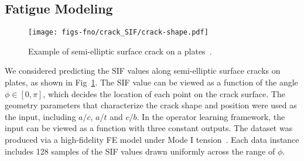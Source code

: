 \subsection{Fatigue Modeling} 
\begin{figure}
    \centering
    \setlength\tabcolsep{0pt}
\texttt{[image: figs-fno/crack\_SIF/crack-shape.pdf]}
    \caption{\small Example of semi-elliptic surface  crack on a plates~\citep{merrell2024stress}. }
    \label{fig:SIF_shape}
\end{figure}
We considered predicting the SIF values along semi-elliptic surface cracks on plates, as shown in Fig~\ref{fig:SIF_shape}. The SIF value can be viewed as a function of the angle $\phi \in [0, \pi]$, which decides the location of each point on the crack surface.  The geometry parameters that characterize the crack shape and position were used as the input, including $a/c$, $a/t$ and $c/b$. In the operator learning framework, the input can be viewed as a function with three constant outputs. The dataset was produced via a high-fidelity FE model under Mode I tension~\citep{merrell2024stress}. Each data instance includes 128 samples of the SIF values drawn uniformly across the range of $\phi$.   

